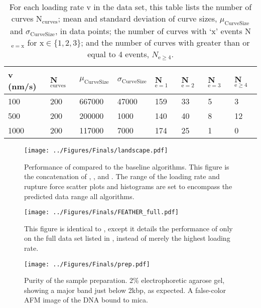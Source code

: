 \begin{table}[htp]
\caption[Data set statistical information]{ For each loading rate v in the data set, this table lists the number of curves N$_{\mathrm{curves}}$; mean and standard deviation of curve sizes, $\mu_{\mathrm{Curve Size}}$ and $\sigma_{\mathrm{Curve Size}}$, in data points; the number of curves with `x' events N$_{\mathrm{e=x}}$ for x$\in\{1,2,3\}$; and the number of curves with greater than or equal to 4 events, $N_{\mathrm{e}\ge4}$. }
\begin{tabularx}{\textwidth}{ l | l | l | l |l |l|l|l }
\hline \hline
v (nm/s) & N$_\mathrm{curves}$ & $\mu_{\mathrm{Curve Size}}$ & $\sigma_{\mathrm{Curve Size}}$ & N$_{\mathrm{e}= 1}$ & N$_{\mathrm{e}= 2}$ & N$_{\mathrm{e}= 3}$ & N$_{\mathrm{e}\ge4}$  \\ \hline
100 & 200 & 667000 & 47000 & 159 & 33 & 5 & 3  \\ \hline
500 & 200 & 200000 & 1000 & 140 & 40 & 8 & 12  \\ \hline
1000 & 200 & 117000 & 7000 & 174 & 25 & 1 & 0  \\ \hline
\end{tabularx}
\end{table}



\begin{figure}[htpb]
\caption[Algorithm performance]{\noindent{} Performance of \name{} compared to the baseline algorithms. This figure is the concatenation of , , and . The range of the loading rate and rupture force scatter plots and histograms are set to encompass the predicted data range all algorithms.}
\centering
\texttt{[image: ../Figures/Finals/landscape.pdf]}%
\end{figure}



\begin{figure}[htp]
\caption[Performance of \name{} on larger data set]{\noindent{} This figure is identical to , except it details the performance of only \name{} on the full data set listed in , instead of merely the highest loading rate.   }
\centering
\texttt{[image: ../Figures/Finals/FEATHER\_full.pdf]}%
\end{figure}

\begin{figure}[htp]
\caption[Verification of sample purity]{\noindent{} Purity of the sample preparation.  2\% electrophoretic agarose gel, showing a major band just below 2kbp, as expected.  A false-color AFM image of the DNA bound to mica.  }
\centering
\texttt{[image: ../Figures/Finals/prep.pdf]}%
\end{figure}



